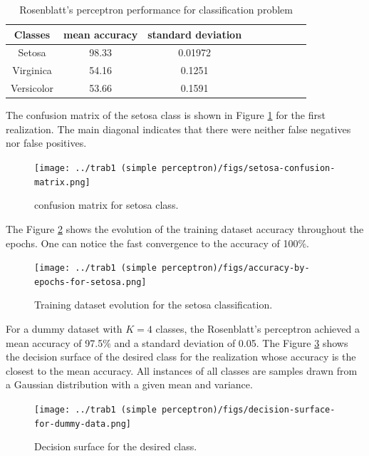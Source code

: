 \documentclass[12pt,a4paper]{article}
\begin{document}
\begin{table}
	\centering
	\caption{Rosenblatt's perceptron performance for classification problem}
	\footnotesize
	\setlength{\tabcolsep}{5pt}
	\begin{tabular}{ccccccccc}
		\hline
		Classes & mean accuracy & standard deviation \\
		\hline
		Setosa & 98.33 & 0.01972 \\
        \hline
		Virginica & 54.16 & 0.1251 \\
		\hline
		Versicolor & 53.66 & 0.1591 \\
		\hline
	\end{tabular} \label{tab:rosenblatt-results}
\end{table}

The confusion matrix of the setosa class is shown in Figure \ref{fig:confusion-matrix-setosa} for the first realization. The main diagonal indicates that there were neither false negatives nor false positives.

\begin{figure}[H]
    \centering
    \texttt{[image: ../trab1 (simple perceptron)/figs/setosa-confusion-matrix.png]}
    \caption{confusion matrix for setosa class.}
    \label{fig:confusion-matrix-setosa}
\end{figure}

The Figure \ref{fig:setosa-training-evolution} shows the evolution of the training dataset accuracy throughout the epochs. One can notice the fast convergence to the accuracy of 100\%.

\begin{figure}[H]
    \centering
    \texttt{[image: ../trab1 (simple perceptron)/figs/accuracy-by-epochs-for-setosa.png]}
    \caption{Training dataset evolution for the setosa classification.}
    \label{fig:setosa-training-evolution}
\end{figure}

For a dummy dataset with \(K=4\) classes, the Rosenblatt's perceptron achieved a mean accuracy of 97.5\% and a standard deviation of 0.05. The Figure \ref{fig:decision-surface-dummy-data} shows the decision surface of the desired class for the realization whose accuracy is the closest to the mean accuracy. All instances of all classes are samples drawn from a Gaussian distribution with a given mean and variance.

\begin{figure}[H]
    \centering
    \texttt{[image: ../trab1 (simple perceptron)/figs/decision-surface-for-dummy-data.png]}
    \caption{Decision surface for the desired class.}
    \label{fig:decision-surface-dummy-data}
\end{figure}
\end{document}
